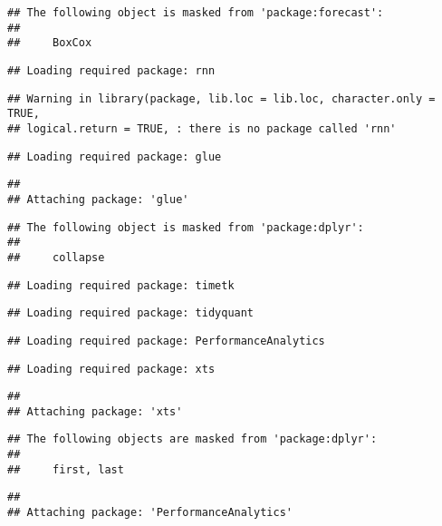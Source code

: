 \documentclass[]{article}
\begin{document}
\begin{verbatim}
## The following object is masked from 'package:forecast':
## 
##     BoxCox
\end{verbatim}

\begin{verbatim}
## Loading required package: rnn
\end{verbatim}

\begin{verbatim}
## Warning in library(package, lib.loc = lib.loc, character.only = TRUE,
## logical.return = TRUE, : there is no package called 'rnn'
\end{verbatim}

\begin{verbatim}
## Loading required package: glue
\end{verbatim}

\begin{verbatim}
## 
## Attaching package: 'glue'
\end{verbatim}

\begin{verbatim}
## The following object is masked from 'package:dplyr':
## 
##     collapse
\end{verbatim}

\begin{verbatim}
## Loading required package: timetk
\end{verbatim}

\begin{verbatim}
## Loading required package: tidyquant
\end{verbatim}

\begin{verbatim}
## Loading required package: PerformanceAnalytics
\end{verbatim}

\begin{verbatim}
## Loading required package: xts
\end{verbatim}

\begin{verbatim}
## 
## Attaching package: 'xts'
\end{verbatim}

\begin{verbatim}
## The following objects are masked from 'package:dplyr':
## 
##     first, last
\end{verbatim}

\begin{verbatim}
## 
## Attaching package: 'PerformanceAnalytics'
\end{verbatim}
\end{document}
